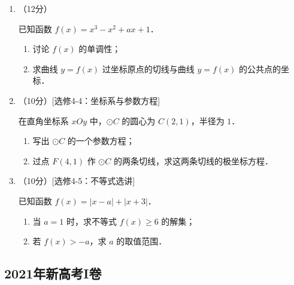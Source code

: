 \begin{description}
\begin{enumerate}[leftmargin=5pt]
        \item （12分）

        已知函数 $f(x)=x^3-x^2+ax+1$．

        \begin{enumerate}[label=(\arabic*)]
            \item 讨论 $f(x)$ 的单调性；
            \item 求曲线 $y=f(x)$ 过坐标原点的切线与曲线 $y=f(x)$ 的公共点的坐标．
        \end{enumerate}

        \item （10分）[选修4-4：坐标系与参数方程]

        在直角坐标系 $xOy$ 中，$\odot C$ 的圆心为 $C(2,1)$，半径为 $1$．

        \begin{enumerate}[label=(\arabic*)]
            \item 写出 $\odot C$ 的一个参数方程；
            \item 过点 $F(4,1)$ 作 $\odot C$ 的两条切线，求这两条切线的极坐标方程．
        \end{enumerate}

        \item （10分）[选修4-5：不等式选讲]

        已知函数 $f(x)=|x-a|+|x+3|$．

        \begin{enumerate}[label=(\arabic*)]
            \item 当 $a=1$ 时，求不等式 $f(x)\geqslant6$ 的解集；
            \item 若 $f(x)>-a$，求 $a$ 的取值范围．
        \end{enumerate}
    \end{enumerate}
\end{description}
\clearpage


\subsection{2021年新高考I卷}\label{gk:2021年新高考I卷}

